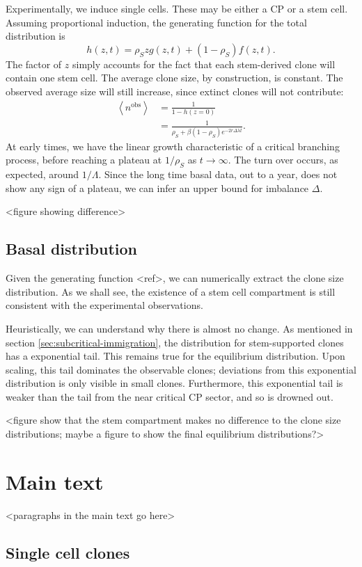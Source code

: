 \documentclass[10pt,UKenglish]{article}
\begin{document}
Experimentally, we induce single cells. These may be either a CP or a stem cell. Assuming proportional induction, the generating function for the total distribution is $$h(z,t) = \rho_S z g(z,t) + (1-\rho_S) f(z,t).$$ The factor of $z$ simply accounts for the fact that each stem-derived clone will contain one stem cell. The average clone size, by construction, is constant. The observed average size will still increase, since extinct clones will not contribute: 
\begin{align*}
\left\langle n^\textrm{obs} \right\rangle &= \frac{1}{1 - h(z=0)} \\
  &= \frac{1}{\rho_S + \beta (1-\rho_S) e^{-2 r \Delta \lambda t}}.
\end{align*}
At early times, we have the linear growth characteristic of a critical branching process, before reaching a plateau at $1/\rho_S$ as $t\rightarrow\infty$. The turn over occurs, as expected, around $1/\Lambda$. Since the long time basal data, out to a year, does not show any sign of a plateau, we can infer an upper bound for imbalance $\Delta$.

<figure showing difference>

\subsection{Basal distribution}

Given the generating function <ref>, we can numerically extract the clone size distribution. As we shall see, the existence of a stem cell compartment is still consistent with the experimental observations.

Heuristically, we can understand why there is almost no change. As mentioned in section \ref{sec:subcritical-immigration}, the distribution for stem-supported clones has a exponential tail. This remains true for the equilibrium distribution. Upon scaling, this tail dominates the observable clones; deviations from this exponential distribution is only visible in small clones. Furthermore, this exponential tail is weaker than the tail from the near critical CP sector, and so is drowned out.

<figure show that the stem compartment makes no difference to the clone size distributions; maybe a figure to show the final equilibrium distributions?>

\section{Main text}

<paragraphs in the main text go here>

\subsection{Single cell clones}
\end{document}
